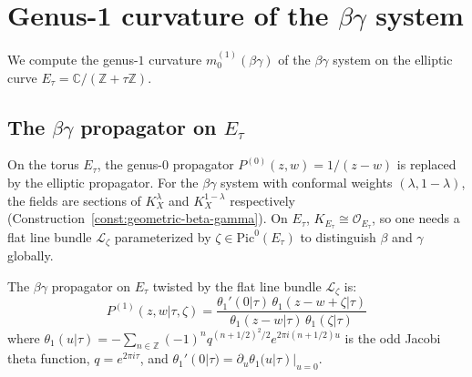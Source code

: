 \section{Genus-1 curvature of the \texorpdfstring{$\beta\gamma$}{beta-gamma} system}
\label{sec:betagamma-genus1}

We compute the genus-$1$ curvature $m_0^{(1)}(\beta\gamma)$ of the
$\beta\gamma$ system on the elliptic curve
$E_\tau = \mathbb{C}/(\mathbb{Z} + \tau\mathbb{Z})$.

\subsection{The \texorpdfstring{$\beta\gamma$}{beta-gamma} propagator on \texorpdfstring{$E_\tau$}{E tau}}

On the torus $E_\tau$, the genus-$0$ propagator
$P^{(0)}(z,w) = 1/(z-w)$ is replaced by the
elliptic propagator.  For the $\beta\gamma$ system with conformal
weights $(\lambda, 1-\lambda)$, the fields are sections of
$K_X^\lambda$ and $K_X^{1-\lambda}$ respectively
(Construction~\ref{const:geometric-beta-gamma}).  On $E_\tau$,
$K_{E_\tau} \cong \mathcal{O}_{E_\tau}$, so one needs a flat
line bundle $\mathcal{L}_\zeta$ parameterized by
$\zeta \in \mathrm{Pic}^0(E_\tau)$ to distinguish $\beta$ and
$\gamma$ globally.

\begin{definition}
\label{def:elliptic-betagamma-propagator}
The $\beta\gamma$ propagator on $E_\tau$ twisted by the flat
line bundle $\mathcal{L}_\zeta$ is:
\begin{equation}\label{eq:elliptic-betagamma-propagator}
P^{(1)}(z,w|\tau,\zeta) = \frac{\theta_1'(0|\tau) \,
\theta_1(z - w + \zeta|\tau)}
{\theta_1(z-w|\tau)\, \theta_1(\zeta|\tau)}
\end{equation}
where $\theta_1(u|\tau) = -\sum_{n \in \mathbb{Z}}
(-1)^n q^{(n+1/2)^2/2} e^{2\pi i (n+1/2)u}$ is the odd Jacobi
theta function, $q = e^{2\pi i \tau}$, and
$\theta_1'(0|\tau) = \partial_u \theta_1(u|\tau)|_{u=0}$.
\end{definition}

